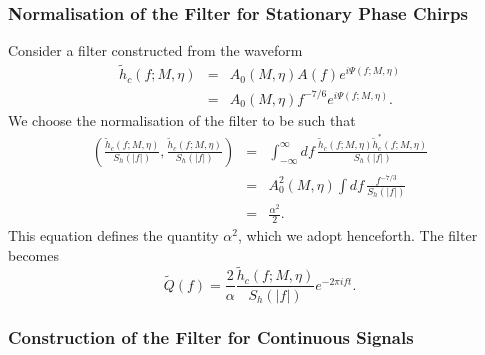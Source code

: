 \subsubsection*{Normalisation of the Filter for Stationary Phase Chirps}

Consider a filter constructed from the waveform
\begin{eqnarray}
\nonumber
\tilde{h}_c(f;M,\eta) 
&=& A_0(M,\eta) A(f) e^{i\Psi(f;M,\eta)} \\
&=& A_0(M,\eta) f^{-7/6} e^{i\Psi(f;M,\eta)}.
\end{eqnarray}
We choose the normalisation of the filter to be such that
\begin{eqnarray}
\nonumber
\left( \frac{\tilde{h}_c(f;M,\eta)}{S_h(|f|)},
    \frac{\tilde{h}_c(f;M,\eta)}{S_h(|f|)} \right) &=&
\int_{-\infty}^{\infty} df\,
\frac{\tilde{h}_c(f;M,\eta) \tilde{h}^{*}_c(f;M,\eta)}
{S_h(|f|)} \\
\nonumber
&=& A_0^2(M,\eta) \int df\, \frac{f^{-7/3}}{S_h(|f|)} \\
&=& \frac{\alpha^2}{2}.
\end{eqnarray}
This equation defines the quantity $\alpha^2$, which we adopt henceforth. 
The filter becomes
\begin{equation}
\tilde{Q}(f) = \frac{2}{\alpha} \frac{\tilde{h}_c(f;M,\eta)}{S_h(|f|)} 
e^{-2\pi ift}.
\end{equation}

\subsubsection*{Construction of the Filter for Continuous Signals}

